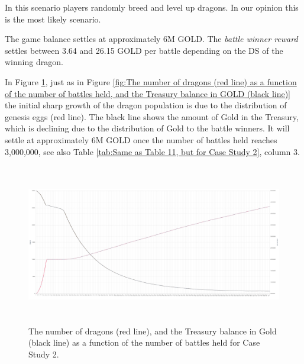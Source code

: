 \documentclass[12pt]{article}
\begin{document}
{\begin{table}[H]
 \end{table}




In this scenario players randomly breed and level up dragons. In our opinion this is the most likely scenario.\par

The game balance settles at approximately 6M GOLD. The \textit{battle winner reward} settles between 3.64 and 26.15 GOLD per battle depending on the DS of the winning dragon.\par

In Figure \ref{fig:CS2The number of dragons (red line) as a function of the number of battles held, and the Treasury balance in Gold (black line).}, just as in Figure \ref{fig:The number of dragons (red line) as a function of the number of battles held, and the Treasury balance in GOLD (black line)} the initial sharp growth of the dragon population is due to the distribution of genesis eggs (red line). The black line shows the amount of Gold in the Treasury, which is declining due to the distribution of Gold to the battle winners. It will settle at approximately 6M GOLD once the number of battles held reaches 3,000,000, see also  Table \ref{tab:Same as Table 11, but for Case Study 2}, column 3.\par




\begin{figure}[H]
	\begin{Center}
		\includegraphics[width=6.27in,height=2.76in]{./media/CS2nimage30.png}
		\caption{The number of dragons (red line), and the Treasury balance in Gold (black line) as a function of the number of battles held for Case Study 2.}
		\label{fig:CS2The number of dragons (red line) as a function of the number of battles held, and the Treasury balance in Gold (black line).}
	\end{Center}
\end{figure}


}
\end{document}
